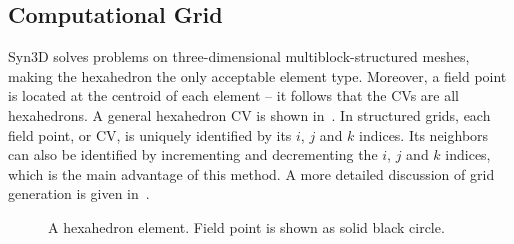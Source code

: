 \subsection{Computational Grid}
%
\label{sec:synmesh}
Syn3D solves problems on three-dimensional multiblock-structured meshes, making the hexahedron the only acceptable element type. Moreover, a field point is located at the centroid of each element -- it follows that the CVs are all hexahedrons. A general hexahedron CV is shown in~. In structured grids, each field point, or CV, is uniquely identified by its $i$, $j$ and $k$ indices. Its neighbors can also be identified by incrementing and decrementing the $i$, $j$ and $k$ indices, which is the main advantage of this method. 
A more detailed discussion of grid generation is given in~\cite{blazek2015computational}.
\begin{figure}
\centering
    
\caption{A hexahedron element. Field point is shown as solid black circle.}\label{fig:hex}
\end{figure}

%  
%
%


%
